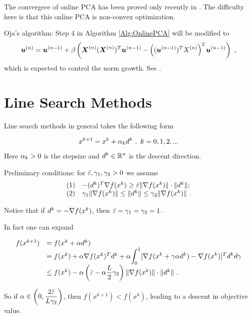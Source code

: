 The convergece of online PCA has been proved only recently in \cite{OnlinePCAMathProgramming}. The difficulty here is that this online PCA is non-convex optimization.

Oja's algorithm: Step 4 in Algorithm \ref{Alg:OnlinePCA} will be modified to
$$\boldsymbol{u}^{(n)}=\boldsymbol{u}^{(n-1)}+\beta\left( \boldsymbol{X}^{(n)}(\boldsymbol{X}^{(n)})^T\boldsymbol{u}^{(n-1)}-\left((\boldsymbol{u}^{(n-1)})^TX^{(n)}\right)^2\boldsymbol{u}^{(n-1)}\right) \ ,$$
which is expected to control the norm growth. See \cite{Oja1982}.


\section{Line Search Methods}

Line search methods in general takes the following form

\begin{equation}\label{Eq:LineSearch}
x^{k+1}=x^k+\alpha_k d^k \ , \ k=0,1,2,...
\end{equation}
Here $\alpha_k>0$ is the stepsize and $d^k\in \mathbb R^n$ is the descent direction.

Preliminary conditions: for $\bar{\varepsilon}, \gamma_1, \gamma_2>0$ we assume 
\begin{equation}\label{Condition:LineSearchMethodGeneral}
\begin{array}{ll}
(1) & -(d^k)^T\grad f(x^k)\geq \bar{\ve}\|\grad f(x^k)\|\cdot \|d^k\|;
\\
(2) & \gm_1\|\grad f(x^k)\|\leq \|d^k\|\leq \gm_2\|\grad f(x^k)\| \ .
\end{array}
\end{equation}

Notice that if $d^k=-\nabla f(x^k)$, then $\bar{\varepsilon}=\gamma_1=\gamma_2=1$.

In fact one can expand

\begin{equation}\label{Eq:StandardExpansionOptimization:LineSearch}
\begin{array}{ll}
f(x^{k+1})& =f(x^k+\alpha d^k)
\\
&=f(x^k)+\alpha \nabla f(x^k)^T d^k+\alpha \displaystyle{\int_0^1 [\nabla f(x^k+\gamma\alpha d^k)-\nabla f(x^k)]^Td^kd\gamma}
\\
&\leq f(x^k)-\alpha \left(\bar{\varepsilon}-\alpha\dfrac{L}{2}\gamma_2\right)\|\nabla f(x^k)\|\cdot \|d^k\| \ .
\end{array}
\end{equation}

So if $\alpha\in \left(0, \dfrac{2\bar{\varepsilon}}{L\gamma_2}\right)$, then $f(x^{k+1})<f(x^k)$, leading to a descent in objective value.

